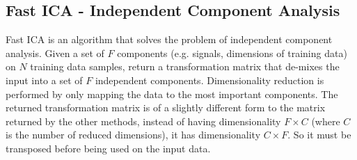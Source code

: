 \documentclass[12pt]{article} %
\begin{document}
\begin{figure}[ph!]
\centering
{}
\end{figure}

\newpage
\subsection{Fast ICA - Independent Component Analysis}
Fast ICA \cite{ica1} is an algorithm that solves the problem of independent component analysis. Given a set of \(F\) components (e.g. signals, dimensions of training data) on \(N\) training data samples, return a transformation matrix that de-mixes the input into a set of \(F\) independent components. Dimensionality reduction is performed by only mapping the data to the most important components. The returned transformation matrix is of a slightly different form to the matrix returned by the other methods, instead of having dimensionality \(F \times C\) (where \(C\) is the number of reduced dimensions), it has dimensionality \(C \times F\). So it must be transposed before being used on the input data.
\end{document}
